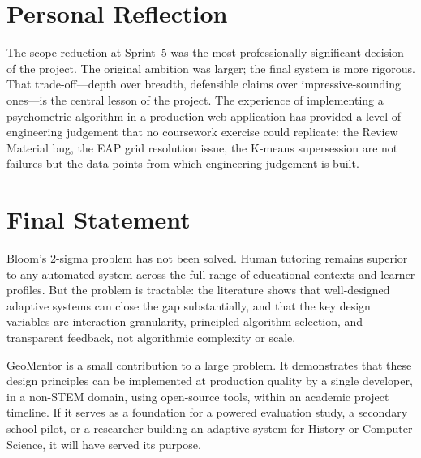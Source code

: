\section{Personal Reflection}
\label{sec:conc_reflection}

The scope reduction at Sprint~5 was the most professionally significant
decision of the project. The original ambition was larger; the final system
is more rigorous. That trade-off---depth over breadth, defensible claims over
impressive-sounding ones---is the central lesson of the project. The experience
of implementing a psychometric algorithm in a production web application has
provided a level of engineering judgement that no coursework exercise could
replicate: the Review Material bug, the EAP grid resolution issue, the K-means
supersession are not failures but the data points from which engineering
judgement is built.

\section{Final Statement}
\label{sec:conc_final}

Bloom's 2-sigma problem has not been solved. Human tutoring remains superior
to any automated system across the full range of educational contexts and
learner profiles. But the problem is tractable: the literature shows that
well-designed adaptive systems can close the gap substantially, and that the
key design variables are interaction granularity, principled algorithm selection,
and transparent feedback, not algorithmic complexity or scale.

GeoMentor is a small contribution to a large problem. It demonstrates that
these design principles can be implemented at production quality by a single
developer, in a non-STEM domain, using open-source tools, within an academic
project timeline. If it serves as a foundation for a powered evaluation study,
a secondary school pilot, or a researcher building an adaptive system for
History or Computer Science, it will have served its purpose.
